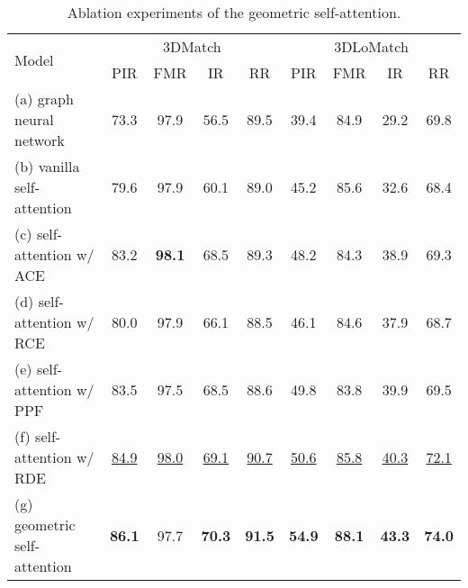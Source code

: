 \begin{table}[!t]
  \scriptsize
  \setlength{\tabcolsep}{3pt}
  \centering
  \begin{tabular}{l|cccc|cccc}
  \toprule
   \multirow{2}{*}{Model} & \multicolumn{4}{c|}{3DMatch} & \multicolumn{4}{c}{3DLoMatch} \\
   & PIR & FMR & IR & RR & PIR & FMR & IR & RR \\
  \midrule
  (a) graph neural network & 73.3 & 97.9 & 56.5 & 89.5 & 39.4 & 84.9 & 29.2 & 69.8 \\
  (b) vanilla self-attention & 79.6 & 97.9 & 60.1 & 89.0 & 45.2 & 85.6 & 32.6 & 68.4 \\
  (c) self-attention w/ ACE & 83.2 & \textbf{98.1} & 68.5 & 89.3 & 48.2 & 84.3 & 38.9 & 69.3 \\
  (d) self-attention w/ RCE & 80.0 & 97.9 & 66.1 & 88.5 & 46.1 & 84.6 & 37.9 & 68.7 \\
  (e) self-attention w/ PPF & 83.5 & 97.5 & 68.5 & 88.6 & 49.8 & 83.8 & 39.9 & 69.5 \\
  (f) self-attention w/ RDE & \underline{84.9} & \underline{98.0} & \underline{69.1} & \underline{90.7} & \underline{50.6} & \underline{85.8} & \underline{40.3} & \underline{72.1} \\
  (g) geometric self-attention & \textbf{86.1} & 97.7 & \textbf{70.3} & \textbf{91.5} & \textbf{54.9} & \textbf{88.1} & \textbf{43.3} & \textbf{74.0} \\
  \bottomrule
  \end{tabular}
  \vspace{-5pt}
  \caption{
  Ablation experiments of the geometric self-attention.
  }
  \label{table:ablation-study-rge}
  \vspace{-10pt}
  \end{table}
  
